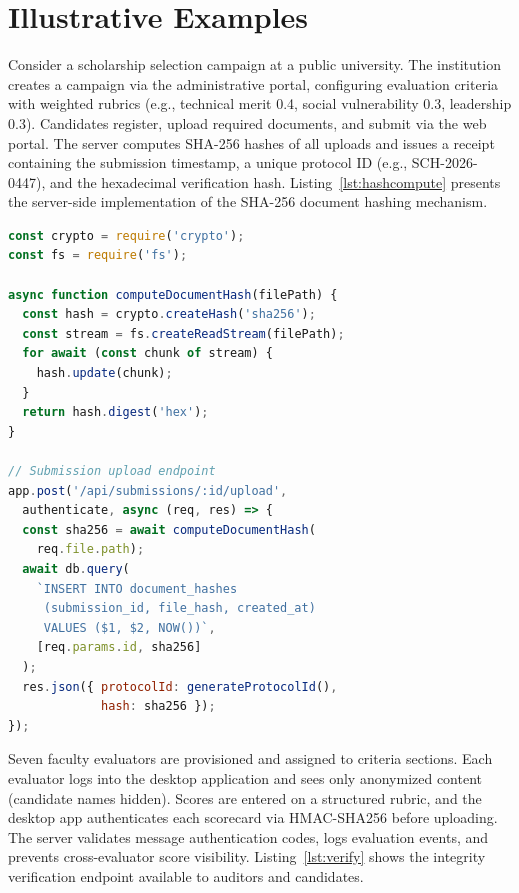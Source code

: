 \documentclass[preprint,12pt,a4paper]{elsarticle}
\begin{document}
\section{Illustrative Examples}

Consider a scholarship selection campaign at a public university. The institution creates a campaign via the administrative portal, configuring evaluation criteria with weighted rubrics (e.g., technical merit 0.4, social vulnerability 0.3, leadership 0.3). Candidates register, upload required documents, and submit via the web portal. The server computes SHA-256 hashes of all uploads and issues a receipt containing the submission timestamp, a unique protocol ID (e.g., SCH-2026-0447), and the hexadecimal verification hash. Listing~\ref{lst:hashcompute} presents the server-side implementation of the SHA-256 document hashing mechanism.

\begin{lstlisting}[language=JavaScript, caption={Server-side SHA-256 hash computation upon document upload. The hash is stored in the database and returned to the candidate as a verification receipt.}, label=lst:hashcompute]
const crypto = require('crypto');
const fs = require('fs');

async function computeDocumentHash(filePath) {
  const hash = crypto.createHash('sha256');
  const stream = fs.createReadStream(filePath);
  for await (const chunk of stream) {
    hash.update(chunk);
  }
  return hash.digest('hex');
}

// Submission upload endpoint
app.post('/api/submissions/:id/upload',
  authenticate, async (req, res) => {
  const sha256 = await computeDocumentHash(
    req.file.path);
  await db.query(
    `INSERT INTO document_hashes
     (submission_id, file_hash, created_at)
     VALUES ($1, $2, NOW())`,
    [req.params.id, sha256]
  );
  res.json({ protocolId: generateProtocolId(),
             hash: sha256 });
});
\end{lstlisting}

Seven faculty evaluators are provisioned and assigned to criteria sections. Each evaluator logs into the desktop application and sees only anonymized content (candidate names hidden). Scores are entered on a structured rubric, and the desktop app authenticates each scorecard via HMAC-SHA256 before uploading. The server validates message authentication codes, logs evaluation events, and prevents cross-evaluator score visibility. Listing~\ref{lst:verify} shows the integrity verification endpoint available to auditors and candidates.
\end{document}
